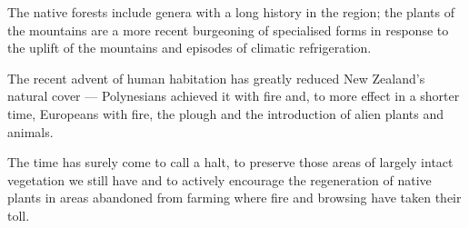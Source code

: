 The native forests include genera with a long history in the region; the plants of the mountains are a more recent burgeoning of specialised forms in response to the uplift of the mountains and episodes of climatic refrigeration.

The recent advent of human habitation has greatly reduced New Zealand's natural cover --- Polynesians achieved it with fire and, to more effect in a shorter time, Europeans with fire, the plough and the introduction of alien plants and animals.

The time has surely come to call a halt, to preserve those areas of largely intact vegetation we still have and to actively encourage the regeneration of native plants in areas abandoned from farming where fire and browsing have taken their toll.
